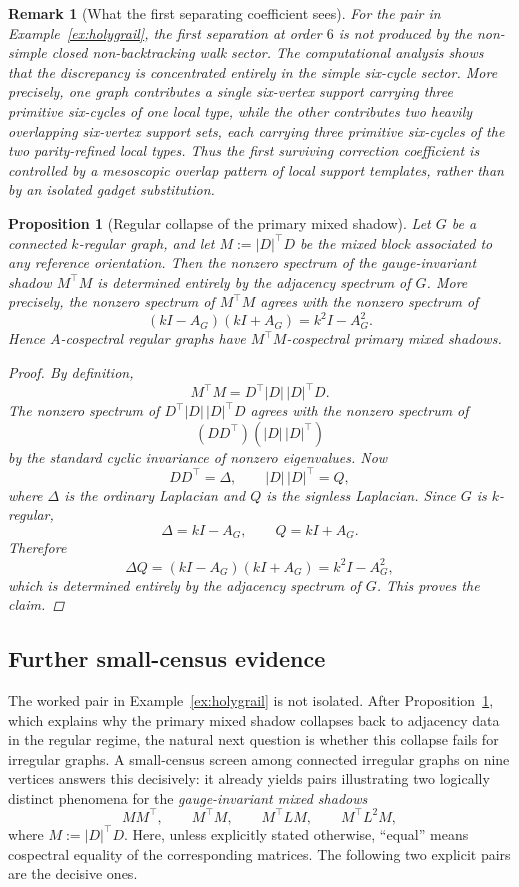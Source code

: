 \documentclass[11pt]{article}
\newtheorem{proposition}{Proposition}
\newtheorem{remark}{Remark}
\begin{document}
\begin{remark}[What the first separating coefficient sees]
For the pair in Example~\ref{ex:holygrail}, the first separation at order $6$ is not produced by the non-simple closed non-backtracking walk sector. The computational analysis shows that the discrepancy is concentrated entirely in the simple six-cycle sector. More precisely, one graph contributes a single six-vertex support carrying three primitive six-cycles of one local type, while the other contributes two heavily overlapping six-vertex support sets, each carrying three primitive six-cycles of the two parity-refined local types. Thus the first surviving correction coefficient is controlled by a mesoscopic overlap pattern of local support templates, rather than by an isolated gadget substitution.
\end{remark}

\begin{proposition}[Regular collapse of the primary mixed shadow]\label{prop:regularcollapse}
Let $G$ be a connected $k$-regular graph, and let $M:=|D|^\top D$ be the mixed block associated to any reference orientation. Then the nonzero spectrum of the gauge-invariant shadow $M^\top M$ is determined entirely by the adjacency spectrum of $G$. More precisely, the nonzero spectrum of $M^\top M$ agrees with the nonzero spectrum of
\[
(kI-A_G)(kI+A_G)=k^2I-A_G^2.
\]
Hence \(A\)-cospectral regular graphs have \(M^\top M\)-cospectral primary mixed shadows.

\begin{proof}
By definition,
\[
M^\top M = D^\top |D|\,|D|^\top D.
\]
The nonzero spectrum of \(D^\top |D|\,|D|^\top D\) agrees with the nonzero spectrum of
\[
(DD^\top)(|D|\,|D|^\top)
\]
by the standard cyclic invariance of nonzero eigenvalues. Now
\[
DD^\top=\Delta,\qquad |D|\,|D|^\top=Q,
\]
where \(\Delta\) is the ordinary Laplacian and \(Q\) is the signless Laplacian. Since \(G\) is \(k\)-regular,
\[
\Delta=kI-A_G,\qquad Q=kI+A_G.
\]
Therefore
\[
\Delta Q=(kI-A_G)(kI+A_G)=k^2I-A_G^2,
\]
which is determined entirely by the adjacency spectrum of \(G\). This proves the claim.
\end{proof}
\end{proposition}

\subsection*{Further small-census evidence}

The worked pair in Example~\ref{ex:holygrail} is not isolated. After Proposition~\ref{prop:regularcollapse}, which explains why the primary mixed shadow collapses back to adjacency data in the regular regime, the natural next question is whether this collapse fails for irregular graphs. A small-census screen among connected irregular graphs on nine vertices answers this decisively: it already yields pairs illustrating two logically distinct phenomena for the \emph{gauge-invariant mixed shadows}
\[
MM^\top,\qquad M^\top M,\qquad M^\top L M,\qquad M^\top L^2 M,
\]
where $M:=|D|^\top D$. Here, unless explicitly stated otherwise, ``equal'' means cospectral equality of the corresponding matrices. The following two explicit pairs are the decisive ones.
\end{document}

